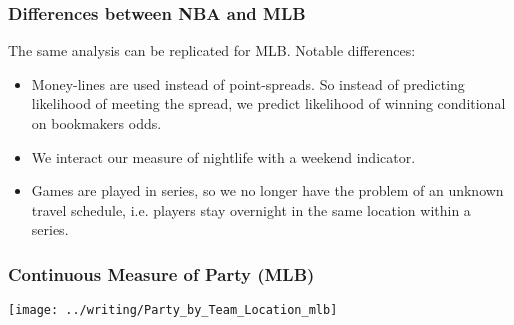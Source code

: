 \documentclass{beamer}
\begin{document}
\begin{frame}   \frametitle{Differences between NBA and MLB}
  The same analysis can be replicated for MLB. Notable differences:
  \begin{itemize}     \item Money-lines are used instead of point-spreads. 
      So instead of predicting likelihood of meeting the spread,
      we predict likelihood of winning conditional on bookmakers odds.
    \item We interact our measure of nightlife with a weekend indicator.
    \item Games are played in series, so we no longer have the problem of an unknown travel schedule, i.e. players stay overnight in the same location within a series.   \end{itemize} \end{frame}

\begin{frame}   
  \frametitle{Continuous Measure of Party (MLB)}
  \centering \texttt{[image: ../writing/Party\_by\_Team\_Location\_mlb]}   
\end{frame}
\end{document}
